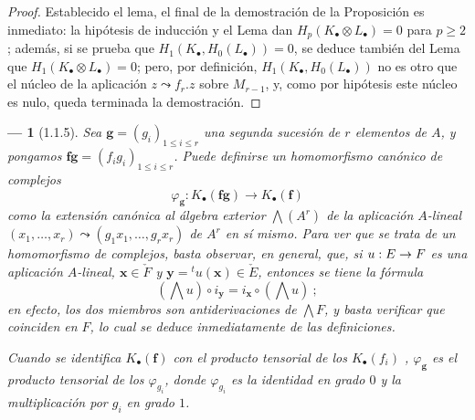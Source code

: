 \documentclass[10pt,oneside,openany]{book}
\theoremstyle{egaenv}\newtheorem*{env}{---}
\theoremstyle{egastatement}
\theoremstyle{egadescription}
\renewcommand{\leq}{\leqslant}
\renewcommand{\geq}{\geqslant}
\renewcommand{\to}{\mathchoice{\longrightarrow}{\rightarrow}{\rightarrow}{\rightarrow}}
\begin{document}
\begin{proof}
Establecido el lema, el final de la demostración de la Proposición  es inmediato: la hipótesis de inducción y el Lema  dan $H_p(K_\bullet\otimes L_\bullet)=0$ para $p\geq2$; además, si se prueba que $H_1(K_\bullet,H_0(L_\bullet))=0$, se deduce también del Lema  que $H_1(K_\bullet\otimes L_\bullet)=0$; pero, por definición, $H_1(K_\bullet,H_0(L_\bullet))$ no es otro que el núcleo de la aplicación $z\leadsto f_r.z$ sobre $M_{r-1}$, y, como por hipótesis este núcleo es nulo, queda terminada la demostración.
\end{proof}

\begin{env}[1.1.5]
\label{III.1.1.5}
\label{III.1.1.5-fr}
Sea $\mathbf g=(g_i)_{1\leq i\leq r}$ una segunda sucesión de $r$ elementos de $A$, y pongamos $\mathbf f\mathbf g=(f_ig_i)_{1\leq i\leq r}$.
Puede definirse un homomorfismo canónico de complejos
\begin{equation}
\label{III.1.1.5.1-fr}
\tag{1.1.5.1}
\varphi_{\mathbf g}:K_\bullet(\mathbf f\mathbf g)\longrightarrow
K_\bullet(\mathbf f)
\end{equation}
como la extensión canónica al álgebra exterior $\bigwedge(A^r)$ de la aplicación $A$-lineal $(x_1,\ldots,x_r)\leadsto(g_1x_1,\ldots,g_rx_r)$ de $A^r$ en sí mismo.
Para ver que se trata de un homomorfismo de complejos, basta observar, en general, que, si $u:E\to F$ es una aplicación $A$-lineal, $\mathbf x\in\check F$ y $\mathbf y={}^tu(\mathbf x)\in\check E$, entonces se tiene la fórmula
\begin{equation}
\label{III.1.1.5.2-fr}
\tag{1.1.5.2}
(\bigwedge u)\circ i_{\mathbf y}=i_{\mathbf x}\circ(\bigwedge u)~;
\end{equation}
en efecto, los dos miembros son antiderivaciones de $\bigwedge F$, y basta verificar que coinciden en $F$, lo cual se deduce inmediatamente de las definiciones.

Cuando se identifica $K_\bullet(\mathbf f)$ con el producto tensorial de los $K_\bullet(f_i)$ , $\varphi_{\mathbf g}$ es el producto tensorial de los $\varphi_{g_i}$, donde $\varphi_{g_i}$ es la identidad en grado $0$ y la multiplicación por $g_i$ en grado $1$.
\end{env}
\end{document}
